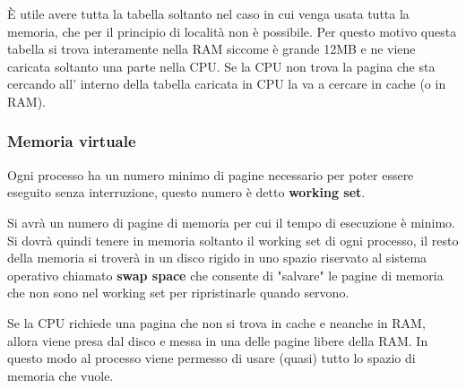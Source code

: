 \documentclass[a4paper]{article}
\theoremstyle{break}
\theoremstyle{break}
\theoremstyle{break}
\theoremstyle{break}
\begin{document}
\noindent È utile avere tutta la tabella soltanto nel caso in cui venga usata tutta la
memoria, che per il principio di località non è possibile. Per questo motivo questa
tabella si trova interamente nella RAM siccome è grande 12MB e ne viene caricata
soltanto una parte nella CPU. Se la CPU non trova la pagina che sta cercando all'
interno della tabella caricata in CPU la va a cercare in cache (o in RAM).

\subsubsection{Memoria virtuale}
Ogni processo ha un numero minimo di pagine necessario per poter essere eseguito senza interruzione,
questo numero è detto \textbf{working set}.

\begin{figure}[H]
  \centering
\end{figure}
\noindent Si avrà un numero di pagine di memoria per cui il tempo di esecuzione è minimo.
Si dovrà quindi tenere in memoria soltanto il working set di ogni processo, il resto
della memoria si troverà in un disco rigido in uno spazio riservato al sistema operativo
chiamato \textbf{swap space} che consente di "salvare" le pagine di memoria che non
sono nel working set per ripristinarle quando servono.

\vspace{1em}
\noindent Se la CPU richiede una pagina che non si trova in cache e neanche in RAM, allora
viene presa dal disco e messa in una delle pagine libere della RAM. In questo modo
al processo viene permesso di usare (quasi) tutto lo spazio di memoria che vuole.
\end{document}
